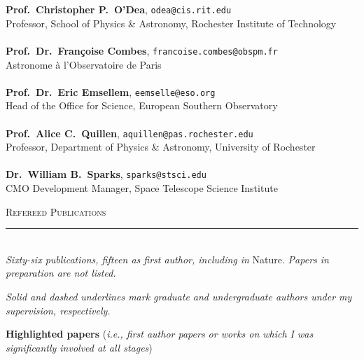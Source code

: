 \documentclass[11pt]{article}
\makeatletter
\def\vhrulefill#1{\leavevmode\leaders\hrule\@height#1\hfill \kern\z@}
\makeatother
\begin{document}
{\textbf{Prof.~Christopher P.~O'Dea}, \texttt{odea@cis.rit.edu}\\
Professor, School of Physics \& Astronomy, Rochester Institute of Technology\\ \\
\textbf{Prof.~Dr.~Fran\c coise Combes}, \texttt{francoise.combes@obspm.fr}\\
Astronome \`a l'Observatoire de Paris\\ \\
\textbf{Prof.~Dr.~Eric Emsellem}, \texttt{eemselle@eso.org}\\
Head of the Office for Science, European Southern Observatory\\ \\
\textbf{Prof.~Alice C.~Quillen}, \texttt{aquillen@pas.rochester.edu}\\
Professor, Department of Physics \& Astronomy, University of Rochester\\ \\
\textbf{Dr.~William B.~Sparks}, \texttt{sparks@stsci.edu}\\
CMO Development Manager, Space Telescope Science Institute\\
}

\vspace{4mm}


\clearpage

\textsc{Refereed Publications} \vhrulefill{0.4pt}\\


\textit{Sixty-six publications, fifteen as first author, including in} Nature. \textit{Papers in preparation are not listed.}

\textit{Solid and dashed underlines mark graduate and undergraduate authors under my supervision, respectively.}\\

\vspace{-1mm}

\textbf{Highlighted papers} (\textit{i.e., first author papers or works on which I was significantly involved at all stages})\\
\end{document}
